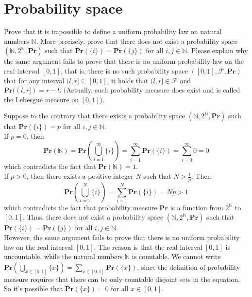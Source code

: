 \documentclass[a4paper, justified]{tufte-handout}
\begin{document}
\section{Probability space}

\begin{problem}
  Prove that it is impossible to define a uniform probability law on natural numbers $\mathbb{N}$. More precisely, prove that there does not exist a probability space $(\mathbb{N},2^{\mathbb{N}},\mathbf{Pr})$ such that $\mathbf{Pr}(\{i\}) = \mathbf{Pr}(\{j\})$ for all $i, j \in \mathbb{N}$. 
  Please explain why the same argument fails to prove that there is no uniform probability law on the real interval $[0,1]$, that is, there is no such probability space $([0,1],\mathcal{F},\mathbf{Pr})$ that for any interval $(l,r] \subseteq [0,1]$, it holds that $(l,r] \in \mathcal{F}$ and $\mathbf{Pr}( (l,r] ) = r-l$. (Actually, such probability measure does exist and is called the Lebesgue measure on $[0,1]$).

\end{problem}

\begin{solution}
  Suppose to the contrary that there exists a probability space $(\mathbb{N},2^{\mathbb{N}},\mathbf{Pr})$ such that $\mathbf{Pr}(\{i\}) = p$ for all $i, j \in \mathbb{N}$. \\
  If $p = 0$, then 
  \[\mathbf{Pr}(\mathbb{N}) = \mathbf{Pr}(\bigcup_{i=1}^\infty \{i\}) = \sum_{i=1}^\infty \mathbf{Pr}(\{i\}) = \sum_{i = 0}^\infty 0 = 0\]
  which contradicts the fact that $\mathbf{Pr}(\mathbb{N}) = 1$. \\
  If $p > 0$, then there exists a positive integer $N$ such that $N > \frac{1}{p}$. Then
  \[\mathbf{Pr}(\bigcup_{i=1}^N \{i\}) = \sum_{i=1}^N \mathbf{Pr}(\{i\}) = Np > 1\]
  which contradicts the fact that probability measure $\mathbf{Pr}$ is a function from $2^{\mathbb{N}}$ to $[0,1]$. Thus, there does not exist a probability space $(\mathbb{N},2^{\mathbb{N}},\mathbf{Pr})$ such that $\mathbf{Pr}(\{i\}) = \mathbf{Pr}(\{j\})$ for all $i, j \in \mathbb{N}$.\\
  However, the same argument fails to prove that there is no uniform probability law on the real interval $[0,1]$. 
  The reason is that the real interval $[0,1]$ is uncountable, while the natural numbers $\mathbb{N}$ is countable.
  We cannot write $\mathbf{Pr} \left(\bigcup_{x \in [0, 1]}\{x\}\right) = \sum_{x \in [0, 1]} \mathbf{Pr}(\{x\})$, since the definition of probability measure requires that there can be only countable disjoint sets in the equation. So it's possible that $\mathbf{Pr}\left(\{x\}\right) = 0$ for all $x \in [0, 1]$. 
\end{solution}
\end{document}
